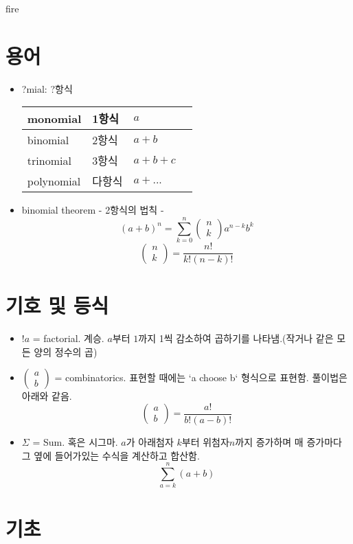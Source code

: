\documentclass{article}
\begin{document}
{\color{red}fire}

\section {용어}
\begin {itemize}
\item ?mial: ?항식
\begin {tabular} {| l | l | l | l |}
\hline
monomial & 1항식 & $a$\\
\hline
binomial & 2항식 & $a+b$\\
\hline
trinomial & 3항식 & $a+b+c$\\
\hline
polynomial & 다항식 & $a+...$\\
\hline
\end {tabular}

\item binomial theorem - 2항식의 법칙 -
$$(a+b)^{n}= \sum_{k=0}^{n} \begin{pmatrix}n \\ k \end{pmatrix} a^{n-k}b^{k}$$
$$\begin{pmatrix} n \\k \end{pmatrix}=\dfrac{n!}{k!(n-k)!} $$
\end {itemize}

\section {기호 및 등식}
\begin {itemize}
\item $!a$ = factorial. 계승. $a$부터 $1$까지 1씩 감소하여 곱하기를 나타냄.(작거나 같은 모든 양의 정수의 곱)
\item $\begin{pmatrix} a \\ b \end{pmatrix}$ = combinatorics. 표현할 때에는 `a choose b` 형식으로 표현함. 풀이법은 아래와 같음.
$$\begin{pmatrix} a\\b \end{pmatrix} = \dfrac{a!}{b!(a-b)!}$$
\item $\Sigma$ = Sum. 혹은 시그마. $a$가 아래첨자 $k$부터 위첨자$n$까지 증가하며 매 증가마다 그 옆에 들어가있는 수식을 계산하고 합산함.
$$ \sum_{a=k}^{n} (a+b) $$
\end {itemize}



\section {기초}
\end{document}
